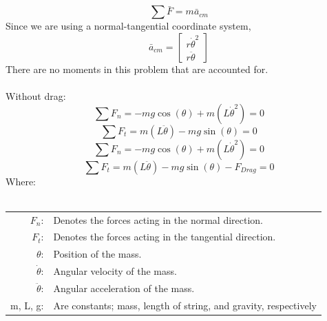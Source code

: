 \documentclass[12pt]{report}
\begin{document}
\begin{flushleft}
$$\sum\bar{F}=m\bar{a}_{cm}$$
Since we are using a normal-tangential coordinate system,
$$
\bar{a}_{cm} =
\begin{bmatrix}
r\dot{\theta}^2\\
r\ddot{\theta}
\end{bmatrix}
$$
There are no moments in this problem that are accounted for. \\
~\\
Without drag:
\begin{equation} \label{eq:fn}
\sum F_n = -mg\cos(\theta) + m(L\dot{\theta}^2) = 0
\end{equation}
\begin{equation} \label{eq:ft}
\sum F_t = m(L\ddot{\theta}) - mg\sin(\theta) = 0
\end{equation}
\newpage
{}
\begin{equation} \label{}
\sum F_n = -mg\cos(\theta) + m(L\dot{\theta}^2) = 0
\end{equation}
\begin{equation}
\sum F_t = m(L\ddot{\theta}) - mg\sin(\theta) - F_{Drag} = 0
\end{equation}
\flushleft
Where: \\
~\\
\begin{tabular}{rl}
$F_n$:& Denotes the forces acting in the normal direction. \\
$F_t$:& Denotes the forces acting in the tangential direction. \\
$\theta$:& Position of the mass. \\
$\dot{\theta}$:& Angular velocity of the mass. \\
$\ddot{\theta}$:& Angular acceleration of the mass. \\
m, L, g: & Are constants; mass, length of string, and gravity, respectively
\end{tabular}

\end{flushleft}
\end{document}
